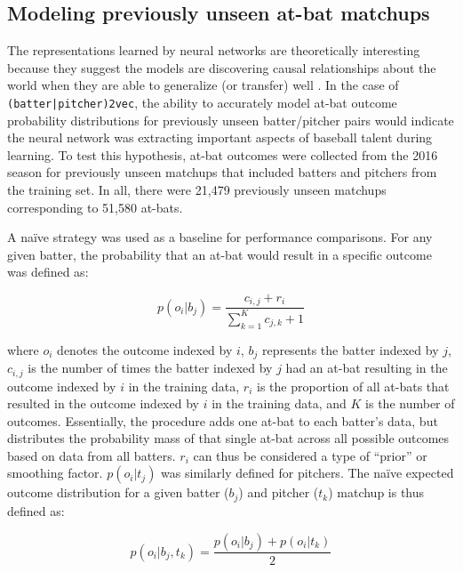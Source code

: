 \documentclass{article}
\begin{document}
\subsection{Modeling previously unseen at-bat matchups}

The representations learned by neural networks are theoretically interesting because they suggest the models are discovering causal relationships about the world when they are able to generalize (or transfer) well \parencite{RepresentationLearning}. In the case of \texttt{(batter|pitcher)2vec}, the ability to accurately model at-bat outcome probability distributions for previously unseen batter/pitcher pairs would indicate the neural network was extracting important aspects of baseball talent during learning. To test this hypothesis, at-bat outcomes were collected from the 2016 season for previously unseen matchups that included batters and pitchers from the training set. In all, there were 21,479 previously unseen matchups corresponding to 51,580 at-bats.

A naïve strategy was used as a baseline for performance comparisons. For any given batter, the probability that an at-bat would result in a specific outcome was defined as:

\begin{equation}
\label{eqn:batter_naïve}
p(o_i|b_j)=\frac{c_{i,j} + r_i}{\sum_{k=1}^{K} c_{j,k} + 1}
\end{equation}

where $o_i$ denotes the outcome indexed by $i$, $b_j$ represents the batter indexed by $j$, $c_{i,j}$ is the number of times the batter indexed by $j$ had an at-bat resulting in the outcome indexed by $i$ in the training data, $r_i$ is the proportion of all at-bats that resulted in the outcome indexed by $i$ in the training data, and $K$ is the number of outcomes. Essentially, the procedure adds one at-bat to each batter's data, but distributes the probability mass of that single at-bat across all possible outcomes based on data from all batters. $r_i$ can thus be considered a type of ``prior'' or smoothing factor. $p(o_i|t_j)$ was similarly defined for pitchers. The naïve expected outcome distribution for a given batter ($b_j$) and pitcher ($t_k$) matchup is thus defined as:

\begin{equation}
\label{eqn:naïve}
p(o_i|b_j,t_k) = \frac{p(o_i|b_j) + p(o_i|t_k)}{2}
\end{equation}
\end{document}
